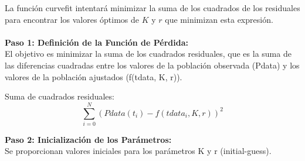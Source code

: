 \documentclass{beamer}
\begin{document}
\begin{frame}
    \small{La función curvefit intentará minimizar la suma de los cuadrados de los residuales para encontrar los valores óptimos de $K$ y $r$ que minimizan esta expresión.} \\\\
    \textbf{Paso 1: Definición de la Función de Pérdida:\\}
    \small{El objetivo es minimizar la suma de los cuadrados residuales, que es la suma de las diferencias cuadradas entre los valores de la población observada (Pdata) y los valores de la población ajustados (f(tdata, K, r)).\\}
    \begin{block}{Suma de cuadrados residuales:}
        $$\sum_{i=0}^{N}(Pdata(t_{i}) - f(tdata_{i}, K, r))^{2}$$
    \end{block}
    \textbf{Paso 2: Inicialización de los Parámetros:}\\
    Se proporcionan valores iniciales para los parámetros K y r (initial-guess).\\
\end{frame}
\end{document}
